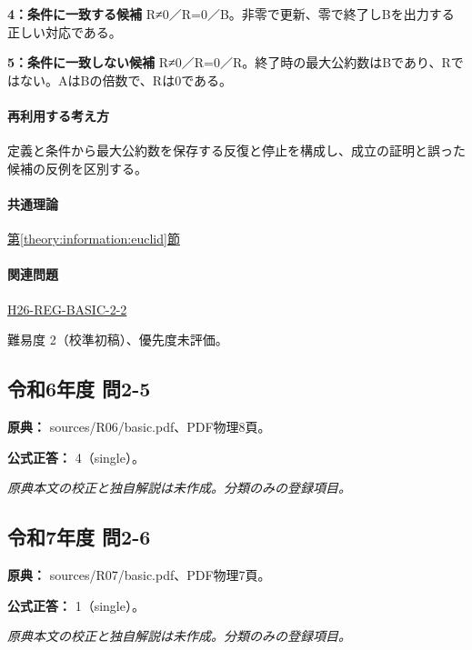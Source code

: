 \noindent\textbf{4：条件に一致する候補} R≠0／R=\allowbreak{}0／B。非零で更新、零で終了しBを出力する正しい対応である。\par

\noindent\textbf{5：条件に一致しない候補} R≠0／R=\allowbreak{}0／R。終了時の最大公約数はBであり、Rではない。AはBの倍数で、Rは0である。\par

\paragraph{再利用する考え方} 定義と条件から最大公約数を保存する反復と停止を構成し、成立の証明と誤った候補の反例を区別する。

\paragraph{共通理論} \hyperref[theory:information:euclid]{第\ref*{theory:information:euclid}節}

\paragraph{関連問題} \hyperref[q:h26-reg-basic-2-2]{H26-REG-BASIC-2-2}

\par 難易度 2（校準初稿）、優先度未評価。

\subsection{令和6年度 問2-5}
\label{q:r06-reg-basic-2-5}

\noindent\textbf{原典：} sources/R06/basic.pdf、PDF物理8頁。

\textbf{公式正答：} 4（single）。

\par\textit{原典本文の校正と独自解説は未作成。分類のみの登録項目。}

\subsection{令和7年度 問2-6}
\label{q:r07-reg-basic-2-6}

\noindent\textbf{原典：} sources/R07/basic.pdf、PDF物理7頁。

\textbf{公式正答：} 1（single）。

\par\textit{原典本文の校正と独自解説は未作成。分類のみの登録項目。}


